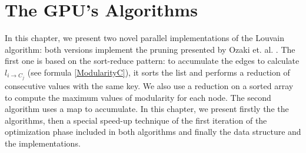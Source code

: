 \section{The GPU's Algorithms}
In this chapter, we present two novel parallel implementations of the Louvain algorithm: both versions implement the pruning presented by Ozaki et. al. \cite{pruning}. The first one is based on the sort-reduce pattern:
to accumulate the edges to calculate $l_{i\rightarrow C_j}$  (see formula \ref{ModularityC}),  it sorts the list and performs a reduction of consecutive values with the same key.  We also use a reduction on a sorted array to compute the maximum values of modularity for each node. 
The second algorithm uses a map to accumulate.
In this chapter, we present firstly the the algorithms, then a special speed-up technique of the first iteration of the optimization phase included in both algorithms and finally the data structure and the implementations.

